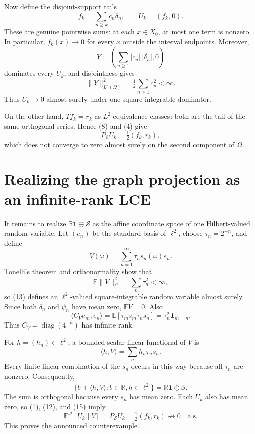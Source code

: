 \documentclass[11pt]{article}
\newcommand{\E}{\mathbb E}
\newcommand{\R}{\mathbb R}
\newcommand{\cS}{\mathcal S}
\newcommand{\cA}{\mathcal A}
\newcommand{\ellTwo}{\ell^2}
\begin{document}
Now define the disjoint-support tails
\[
 f_k=\sum_{n\ge k}c_n\delta_n,
 \qquad U_k=(f_k,0).
 \tag{9}
\]
These are genuine pointwise sums: at each \(x\in X_0\), at most one term is
nonzero. In particular, \(f_k(x)\to0\) for every \(x\) outside the interval
endpoints. Moreover,
\[
 Y=\left(\sum_{n\ge1}|c_n|\,|\delta_n|,0\right)
 \tag{10}
\]
dominates every \(U_k\), and disjointness gives
\[
 \|Y\|_{L^2(\Omega)}^2
 =\tfrac12\sum_{n\ge1}c_n^2<\infty.
 \tag{11}
\]
Thus \(U_k\to0\) almost surely under one square-integrable dominator.

On the other hand, \(Tf_k=r_k\) as \(L^2\) equivalence classes: both are the
tail of the same orthogonal series. Hence (8) and (4) give
\[
 P_{\cS}U_k=\tfrac12(f_k,r_k),
 \tag{12}
\]
which does not converge to zero almost surely on the second component of
\(\Omega\).

\section{Realizing the graph projection as an infinite-rank LCE}

It remains to realize \(\mathbb R\mathbf1\oplus\cS\) as the affine
coordinate space of one Hilbert-valued random variable. Let
\((e_n)\) be the standard basis of \(\ellTwo\), choose
\(\tau_n=2^{-n}\), and define
\begin{equation}
 V(\omega)=\sum_{n=1}^\infty \tau_ns_n(\omega)e_n.
 \tag{13}
\end{equation}
Tonelli's theorem and orthonormality show that
\[
 \E\|V\|_{\ellTwo}^2=\sum_n\tau_n^2<\infty,
\]
so (13) defines an \(\ellTwo\)-valued square-integrable random variable
almost surely. Since both \(\delta_n\) and \(\psi_n\) have mean zero,
\(\E V=0\). Also
\[
 \langle C_Ve_m,e_n\rangle
 =\E[\tau_ms_m\tau_ns_n]
 =\tau_n^2\mathbf1_{m=n}.
 \tag{14}
\]
Thus \(C_V=\operatorname{diag}(4^{-n})\) has infinite rank.

For \(h=(h_n)\in\ellTwo\), a bounded scalar linear functional of \(V\) is
\[
 \langle h,V\rangle=\sum_nh_n\tau_ns_n.
\]
Every finite linear combination of the \(s_n\) occurs in this way because
all \(\tau_n\) are nonzero. Consequently,
\[
 \overline{\{b+\langle h,V\rangle:b\in\R, h\in\ellTwo\}}
 =\mathbb R\mathbf1\oplus\cS.
 \tag{15}
\]
The sum is orthogonal because every \(s_n\) has mean zero. Each \(U_k\) also
has mean zero, so (1), (12), and (15) imply
\[
 \E^{\cA}[U_k\mid V]=P_{\cS}U_k
 =\tfrac12(f_k,r_k)\not\longrightarrow0\quad\text{a.s.}
\]
This proves the announced counterexample.
\end{document}
